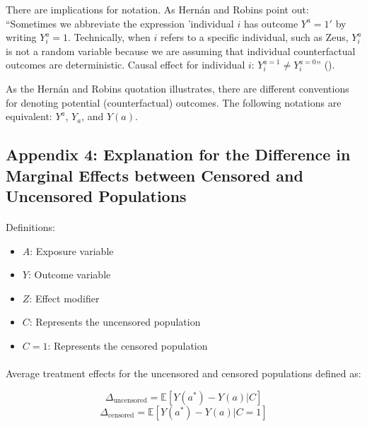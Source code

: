 \documentclass[
  singlecolumn]{article}
\makeatletter
\let\oldparagraph\paragraph
\renewcommand{\paragraph}{
    \@ifstar
      \xxxParagraphStar
      \xxxParagraphNoStar
  }
\newcommand{\xxxParagraphStar}[1]{\oldparagraph*{#1}\mbox{}}
\newcommand{\xxxParagraphNoStar}[1]{\oldparagraph{#1}\mbox{}}
\providecommand{\tightlist}{%
  \setlength{\itemsep}{0pt}\setlength{\parskip}{0pt}}\usepackage{longtable,booktabs,array}
\makeatother
\begin{document}
There are implications for notation. As Hernán and Robins point out:
``Sometimes we abbreviate the expression 'individual \(i\) has outcome
\(Y^a = 1'\) by writing \(Y^a_i = 1\). Technically, when \(i\) refers to
a specific individual, such as Zeus, \(Y^a_i\) is not a random variable
because we are assuming that individual counterfactual outcomes are
deterministic. Causal effect for individual \(i\):
\(Y^{a=1}_i \neq Y^{a=0}_i\)'' ().

As the Hernán and Robins quotation illustrates, there are different
conventions for denoting potential (counterfactual) outcomes. The
following notations are equivalent: \(Y^a\), \(Y_a\), and \(Y(a)\).

\newpage{}

\subsection{Appendix 4: Explanation for the Difference in Marginal
Effects between Censored and Uncensored
Populations}\label{appendix-4-explanation-for-the-difference-in-marginal-effects-between-censored-and-uncensored-populations}

\paragraph{Definitions:}\label{definitions}

\begin{itemize}
\tightlist
\item
  \textbf{\(A\)}: Exposure variable
\item
  \textbf{\(Y\)}: Outcome variable
\item
  \textbf{\(Z\)}: Effect modifier
\item
  \textbf{\(C\)}: Represents the uncensored population
\item
  \textbf{\(C=1\)}: Represents the censored population
\end{itemize}

\paragraph{Average treatment effects for the uncensored and censored
populations defined
as:}\label{average-treatment-effects-for-the-uncensored-and-censored-populations-defined-as}

\[
\Delta_{\text{uncensored}} = \mathbb{E}[Y(a^*) - Y(a) | C]
\] \[
\Delta_{\text{censored}} = \mathbb{E}[Y(a^*) - Y(a) | C=1]
\]
\end{document}
